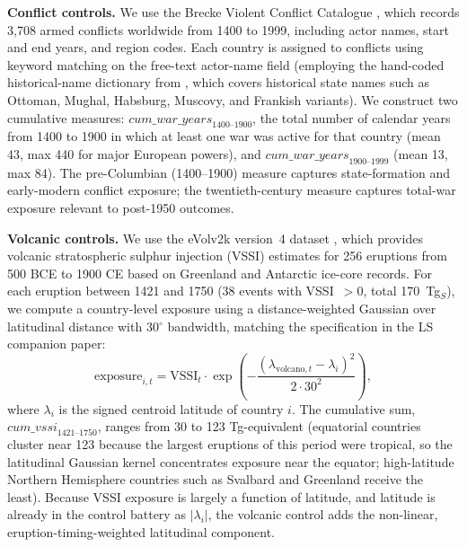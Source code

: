 \documentclass[11pt,letterpaper]{article}
\begin{document}
\textbf{Conflict controls.} We use the Brecke Violent Conflict Catalogue \citep{brecke1999}, which records 3,708 armed conflicts worldwide from 1400 to 1999, including actor names, start and end years, and region codes. Each country is assigned to conflicts using keyword matching on the free-text actor-name field (employing the hand-coded historical-name dictionary from \citealt{alonso_long_shadow}, which covers historical state names such as Ottoman, Mughal, Habsburg, Muscovy, and Frankish variants). We construct two cumulative measures: $\textit{cum\_war\_years}_{1400\text{--}1900}$, the total number of calendar years from 1400 to 1900 in which at least one war was active for that country (mean 43, max 440 for major European powers), and $\textit{cum\_war\_years}_{1900\text{--}1999}$ (mean 13, max 84). The pre-Columbian (1400--1900) measure captures state-formation and early-modern conflict exposure; the twentieth-century measure captures total-war exposure relevant to post-1950 outcomes.

\textbf{Volcanic controls.} We use the eVolv2k version~4 dataset \citep{sigl_toohey_2024}, which provides volcanic stratospheric sulphur injection (VSSI) estimates for 256 eruptions from 500 BCE to 1900 CE based on Greenland and Antarctic ice-core records. For each eruption between 1421 and 1750 (38 events with VSSI~$>0$, total 170~Tg$_S$), we compute a country-level exposure using a distance-weighted Gaussian over latitudinal distance with 30$^\circ$ bandwidth, matching the specification in the LS companion paper:
\[
  \text{exposure}_{i,t} = \text{VSSI}_t \cdot \exp\!\left(-\frac{(\lambda_{\text{volcano},t} - \lambda_i)^2}{2 \cdot 30^2}\right),
\]
where $\lambda_i$ is the signed centroid latitude of country $i$. The cumulative sum, $\textit{cum\_vssi}_{1421\text{--}1750}$, ranges from 30 to 123 Tg-equivalent (equatorial countries cluster near 123 because the largest eruptions of this period were tropical, so the latitudinal Gaussian kernel concentrates exposure near the equator; high-latitude Northern Hemisphere countries such as Svalbard and Greenland receive the least). Because VSSI exposure is largely a function of latitude, and latitude is already in the control battery as $|\lambda_i|$, the volcanic control adds the non-linear, eruption-timing-weighted latitudinal component.
\end{document}
